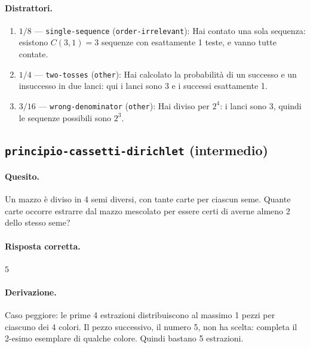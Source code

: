 \paragraph{Distrattori.}
\begin{enumerate}
  \item $1/8$ --- \texttt{single-sequence} (\texttt{order-irrelevant}): Hai contato una sola sequenza: esistono $C(3,1) = 3$ sequenze con esattamente 1 teste, e vanno tutte contate.
  \item $1/4$ --- \texttt{two-tosses} (\texttt{other}): Hai calcolato la probabilità di un successo e un insuccesso in due lanci: qui i lanci sono 3 e i successi esattamente 1.
  \item $3/16$ --- \texttt{wrong-denominator} (\texttt{other}): Hai diviso per $2^{4}$: i lanci sono 3, quindi le sequenze possibili sono $2^{3}$.
\end{enumerate}

\subsection{\texorpdfstring{\texttt{principio-cassetti-dirichlet} (intermedio)}{principio-cassetti-dirichlet (intermedio)}}

\paragraph{Quesito.} Un mazzo è diviso in 4 semi diversi, con tante carte per ciascun seme. Quante carte occorre estrarre dal mazzo mescolato per essere certi di averne almeno 2 dello stesso seme?

\paragraph{Risposta corretta.} $5$

\paragraph{Derivazione.} Caso peggiore: le prime 4 estrazioni distribuiscono al massimo 1 pezzi per ciascuno dei 4 colori. Il pezzo successivo, il numero 5, non ha scelta: completa il 2-esimo esemplare di qualche colore. Quindi bastano 5 estrazioni.

